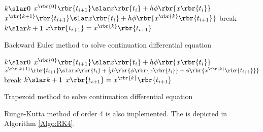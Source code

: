 \documentclass[english, nochinese]{pkupaper}
\begin{document}
\begin{algorithm}
\SetAlgoLined


\BlankLine

{
    $ k \slar 0 $\;
    $ x^{\rbr{0}} \rbr{t_{ i + 1 }} \slar x \rbr{t_i} + h \phi \rbr{ x \rbr{t_i} } $\;
    {
        $ x^{\rbr{ k + 1 }} \rbr{t_{ i + 1 }} \slar x \rbr{t_i} + h \phi \rbr{ x^{\rbr{k}} \rbr{t_{ i + 1 }} } $\;
        {
            break\;
        }
        $ k \slar k + 1 $\;
    }
    $ x \rbr{t_{ i + 1 }} = x^{\rbr{k}} \rbr{t_{ i + 1 }} $\;
}


\BlankLine

\caption{Backward Euler method to solve continuation differential equation}
\label{Algo:ImpEuler}
\end{algorithm}

\begin{algorithm}
\SetAlgoLined


\BlankLine

{
    $ k \slar 0 $\;
    $ x^{\rbr{0}} \rbr{t_{ i + 1 }} \slar x \rbr{t_i} + h \phi \rbr{ x \rbr{t_i} } $\;
    {
        $ x^{\rbr{ k + 1 }} \rbr{t_{ i + 1 }} \slar x \rbr{t_i} + \frac{1}{2} h \rbr{ \phi \rbr{ x \rbr{t_i} } + \phi \rbr{ x^{\rbr{k}} \rbr{t_{ i + 1 }} } }$\;
        {
            break\;
        }
        $ k \slar k + 1 $\;
    }
    $ x \rbr{t_{ i + 1 }} = x^{\rbr{k}} \rbr{t_{ i + 1 }} $\;
}


\BlankLine

\caption{Trapezoid method to solve continuation differential equation}
\label{Algo:Trap}
\end{algorithm}

Runge-Kutta method of order 4 is also implemented. The is depicted in Algorithm \ref{Algo:RK4}.
\end{document}
